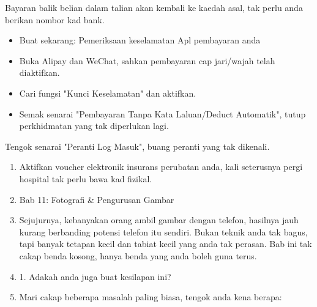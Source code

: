 \begin{tcbwarn}{Bayaran balik belian dalam talian akan kembali ke kaedah asal, tak perlu anda berikan nombor kad bank.}
\begin{itemize}
  \item Buat sekarang: Pemeriksaan keselamatan Apl pembayaran anda
  \item Buka Alipay dan WeChat, sahkan pembayaran cap jari/wajah telah diaktifkan.
  \item Cari fungsi "Kunci Keselamatan" dan aktifkan.
  \item Semak senarai "Pembayaran Tanpa Kata Laluan/Deduct Automatik", tutup perkhidmatan yang tak diperlukan lagi.
\end{itemize}

\end{tcbwarn}

\begin{tcbpractice}{Tengok senarai "Peranti Log Masuk", buang peranti yang tak dikenali.}
\begin{enumerate}
  \item Aktifkan voucher elektronik insurans perubatan anda, kali seterusnya pergi hospital tak perlu bawa kad fizikal.
  \item Bab 11: Fotografi \& Pengurusan Gambar
  \item Sejujurnya, kebanyakan orang ambil gambar dengan telefon, hasilnya jauh kurang berbanding potensi telefon itu sendiri. Bukan teknik anda tak bagus, tapi banyak tetapan kecil dan tabiat kecil yang anda tak perasan. Bab ini tak cakap benda kosong, hanya benda yang anda boleh guna terus.
  \item 1. Adakah anda juga buat kesilapan ini?
  \item Mari cakap beberapa masalah paling biasa, tengok anda kena berapa:
\end{enumerate}

\end{tcbpractice}
